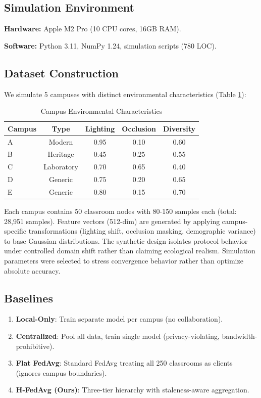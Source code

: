 \documentclass[conference]{IEEEtran}
\begin{document}
\subsection{Simulation Environment}

\textbf{Hardware:} Apple M2 Pro (10 CPU cores, 16GB RAM).

\textbf{Software:} Python 3.11, NumPy 1.24, simulation scripts (780 LOC).

\subsection{Dataset Construction}

We simulate 5 campuses with distinct environmental characteristics (Table \ref{tab:campus_chars}):

\begin{table}[h]
\centering
\caption{Campus Environmental Characteristics}
\label{tab:campus_chars}
\begin{tabular}{lcccc}
\toprule
\textbf{Campus} & \textbf{Type} & \textbf{Lighting} & \textbf{Occlusion} & \textbf{Diversity} \\
\midrule
A & Modern & 0.95 & 0.10 & 0.60 \\
B & Heritage & 0.45 & 0.25 & 0.55 \\
C & Laboratory & 0.70 & 0.65 & 0.40 \\
D & Generic & 0.75 & 0.20 & 0.65 \\
E & Generic & 0.80 & 0.15 & 0.70 \\
\bottomrule
\end{tabular}
\end{table}

Each campus contains 50 classroom nodes with 80-150 samples each (total: 28,951 samples). Feature vectors (512-dim) are generated by applying campus-specific transformations (lighting shift, occlusion masking, demographic variance) to base Gaussian distributions. The synthetic design isolates protocol behavior under controlled domain shift rather than claiming ecological realism. Simulation parameters were selected to stress convergence behavior rather than optimize absolute accuracy.

\subsection{Baselines}

\begin{enumerate}
    \item \textbf{Local-Only}: Train separate model per campus (no collaboration).
    \item \textbf{Centralized}: Pool all data, train single model (privacy-violating, bandwidth-prohibitive).
    \item \textbf{Flat FedAvg}: Standard FedAvg treating all 250 classrooms as clients (ignores campus boundaries).
    \item \textbf{H-FedAvg (Ours)}: Three-tier hierarchy with staleness-aware aggregation.
\end{enumerate}
\end{document}
